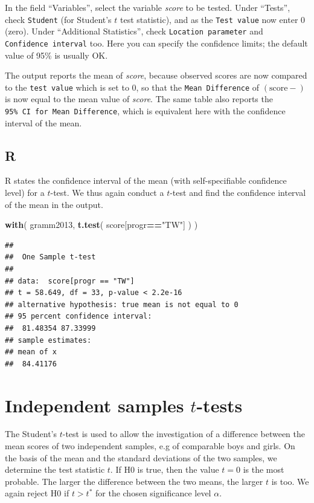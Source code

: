 \documentclass[
]{book}
\newenvironment{Shaded}{\begin{snugshade}}{\end{snugshade}}
\newcommand{\KeywordTok}[1]{\textcolor[rgb]{0.13,0.29,0.53}{\textbf{#1}}}
\newcommand{\NormalTok}[1]{#1}
\newcommand{\OperatorTok}[1]{\textcolor[rgb]{0.81,0.36,0.00}{\textbf{#1}}}
\newcommand{\StringTok}[1]{\textcolor[rgb]{0.31,0.60,0.02}{#1}}
\begin{document}
In the field ``Variables'', select the variable \emph{score} to be tested.
Under ``Tests'', check \texttt{Student} (for Student's \(t\) test statistic), and as the \texttt{Test\ value} now enter \(0\) (zero).
Under ``Additional Statistics'', check \texttt{Location\ parameter} and \texttt{Confidence\ interval} too. Here you can specify the confidence limits; the default value of 95\% is usually OK.

The output reports the mean of \emph{score}, because observed scores are now compared to the \texttt{test\ value} which is set to \(0\), so that the \texttt{Mean\ Difference} of \((\textrm{score}-)\) is now equal to the mean value of \emph{score}. The same table also reports the \texttt{95\%\ CI\ for\ Mean\ Difference}, which is equivalent here with the confidence interval of the mean.

\hypertarget{r-12}{%
\subsection{R}\label{r-12}}

R states the confidence interval of the mean (with self-specifiable
confidence level) for a \(t\)-test. We thus again conduct a \(t\)-test
and find the confidence interval of the mean in the
output.

\begin{Shaded}
\begin{Highlighting}[]
\KeywordTok{with}\NormalTok{( gramm2013, }\KeywordTok{t.test}\NormalTok{( score[progr}\OperatorTok{==}\StringTok{"TW"}\NormalTok{] ) )}
\end{Highlighting}
\end{Shaded}

\begin{verbatim}
## 
##  One Sample t-test
## 
## data:  score[progr == "TW"]
## t = 58.649, df = 33, p-value < 2.2e-16
## alternative hypothesis: true mean is not equal to 0
## 95 percent confidence interval:
##  81.48354 87.33999
## sample estimates:
## mean of x 
##  84.41176
\end{verbatim}

\hypertarget{sec:ttest-indep}{%
\section{\texorpdfstring{Independent samples \(t\)-tests}{Independent samples t-tests}}\label{sec:ttest-indep}}

The Student's \(t\)-test is used to allow the investigation of a difference
between the mean scores of two independent samples, e.g of
comparable boys and girls. On the basis of the mean and the standard
deviations of the two samples, we determine the test statistic \(t\).
If H0 is true, then the value \(t=0\) is the most probable. The larger the difference
between the two means, the larger \(t\) is too. We again reject H0 if \(t>t^*\)
for the chosen significance level \(\alpha\).
\end{document}
